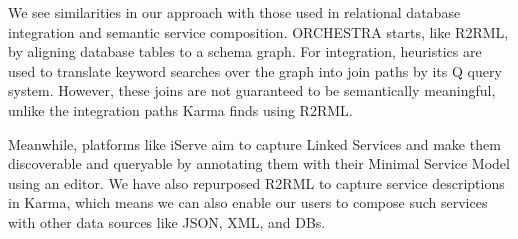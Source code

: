 We see similarities in our approach with those used in relational database integration and semantic service composition.  
ORCHESTRA\cite{ives2008orchestra} starts, like R2RML, by aligning database tables to a schema graph.  
For integration, heuristics are used to translate keyword searches over the graph into join paths by its Q query system. 
However, these joins are not guaranteed to be semantically meaningful, unlike the integration paths Karma finds using R2RML.

Meanwhile, platforms like iServe\cite{pedrinaci2010iserve} aim to capture Linked Services and make them discoverable and queryable by annotating them with their Minimal Service Model using an editor.
We have also repurposed R2RML to capture service descriptions in Karma\cite{taheriyan12:lapis}, which means we can also enable our users to compose such services with other data sources like JSON, XML, and DBs. 
